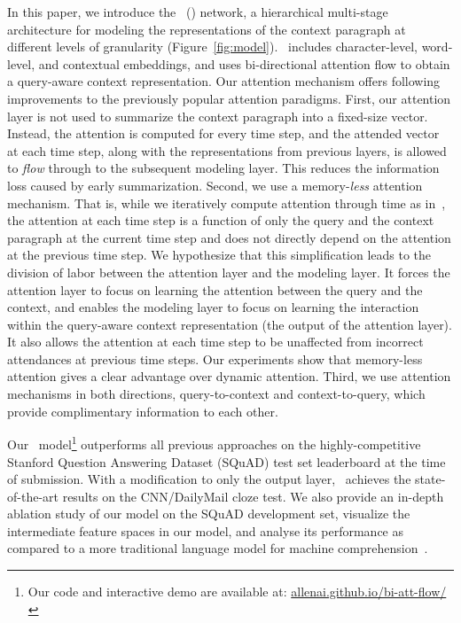 In this paper, we introduce the \sys\  (\sysshort) network, a hierarchical multi-stage architecture for modeling the representations of the context paragraph at different levels of granularity (Figure~\ref{fig:model}). 
\sysshort\ includes character-level, word-level, and contextual embeddings, and uses bi-directional attention flow to obtain a query-aware context representation. 
Our attention mechanism offers following improvements to the previously popular attention paradigms. 
First, our attention layer is not used to summarize the context paragraph into a fixed-size vector. 
Instead, the attention is computed for every time step, and the attended vector at each time step, along with the representations from previous layers, is allowed to \emph{flow} through to the subsequent modeling layer.
This reduces the information loss caused by early summarization. 
Second, we use a memory-\emph{less} attention mechanism.
That is, while we iteratively compute attention through time as in~\cite{Bahdanau2014NeuralMT}, the attention at each time step is a function of only the query and the context paragraph at the current time step and does not directly depend on the attention at the previous time step.
We hypothesize that this simplification leads to the division of labor between the attention layer and the modeling layer.
It forces the attention layer to focus on learning the attention between the query and the  context, and enables the modeling layer to focus on learning the interaction within the query-aware context representation (the output of the attention layer).
It also allows the attention at each time step to be unaffected from incorrect attendances at previous time steps. 
Our experiments show that memory-less attention gives a clear advantage over dynamic attention. 
Third, we use attention mechanisms in both directions, query-to-context and context-to-query, which provide complimentary information to each other.

Our \sysshort\ model\footnote{Our code and interactive demo are available at: \url{allenai.github.io/bi-att-flow/}}  outperforms all previous approaches on the highly-competitive Stanford Question Answering Dataset (SQuAD) test set leaderboard at the time of submission.
With a modification to only the output layer, \sysshort\ achieves the state-of-the-art results on the CNN/DailyMail cloze test. 
We also provide an in-depth ablation study of our model on the SQuAD development set, visualize the intermediate feature spaces in our model, and analyse its performance as compared to a more traditional language model for machine comprehension~\citep{rajpurkar2016squad}.
